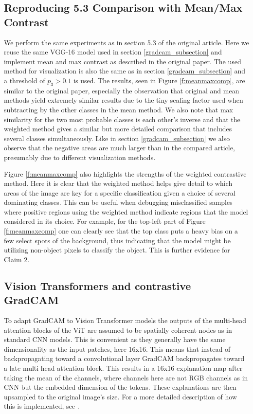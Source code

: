 



\subsection{Reproducing 5.3 Comparison with Mean/Max Contrast}

We perform the same experiments as in section 5.3 of the original article. Here we reuse the same VGG-16 model used in section \ref{gradcam_subsection} and implement mean and max contrast as described in the original paper. The used method for visualization is also the same as in section \ref{gradcam_subsection} and a threshold of $p_3 > 0.1$ is used. The results, seen in Figure \ref{f:meanmaxcomp}, are similar to the original paper, especially the observation that original and mean methods yield extremely similar results due to the tiny scaling factor used when subtracting by the other classes in the mean method. We also note that max similarity for the two most probable classes is each other's inverse and that the weighted method gives a similar but more detailed comparison that includes several classes simultaneously. Like in section \ref{gradcam_subsection} we also observe that the negative areas are much larger than in the compared article, presumably due to different visualization methods.

Figure \ref{f:meanmaxcomp} also highlights the strengths of the weighted contrastive method. Here it is clear that the weighted method helps give detail to which areas of the image are key for a specific classification given a choice of several dominating classes. This can be useful when debugging misclassified samples where positive regions using the weighted method indicate regions that the model considered in its choice. For example, for the top-left part of Figure \ref{f:meanmaxcomp} one can clearly see that the top class puts a heavy bias on a few select spots of the background, thus indicating that the model might be utilizing non-object pixels to classify the object. This is further evidence for Claim 2.




\subsection{Vision Transformers and contrastive GradCAM}
To adapt GradCAM to Vision Transformer models the outputs of the multi-head attention blocks of the ViT are assumed to be spatially coherent nodes as in standard CNN models. This is convenient as they generally have the same dimensionality as the input patches, here 16x16. This means that instead of backpropagating toward a convolutional layer GradCAM backpropagates toward a late multi-head attention block. This results in a 16x16 explanation map after taking the mean of the channels, where channels here are not RGB channels as in CNN but the embedded dimension of the tokens. These explanations are then upsampled to the original image's size. For a more detailed description of how this is implemented, see \citet{gradcam-vit}. 

